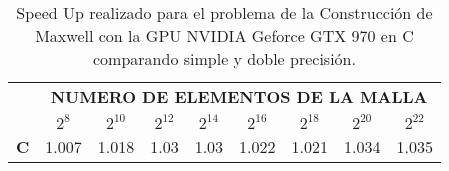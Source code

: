 \begin{table}[]
    \begin{tabular}{|c|c|c|c|c|c|c|c|c|}
    \hline
    \multirow{2}{*}{} & \multicolumn{8}{c|}{\textbf{NUMERO DE ELEMENTOS DE LA MALLA}} \\ \cline{2-9} 
                      & $2^8$ & $2^10$& $2^12$& $2^14$& $2^16$& $2^18$& $2^20$& $2^22$\\ \hline
    \textbf{C}        & 1.007 & 1.018 & 1.03  & 1.03  & 1.022 & 1.021 & 1.034 & 1.035 \\ \hline
    \end{tabular}
    \caption{Speed Up realizado para el problema de la Construcción de Maxwell con la GPU NVIDIA Geforce GTX 970 en C comparando simple y doble precisión.}
    \label{tab:c_970_MxC_c_10}
    \end{table}